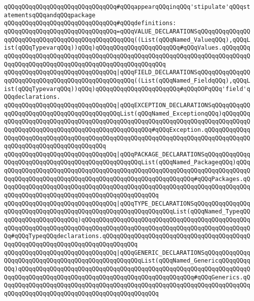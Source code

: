 \verb|qQQqqQQqqQQqqQQqqQQqqQQqqQQqqQQq#qQQqappearqQQqinqQQq'stipulate'qQQqstatementsqQQqandqQQqpackage|\newline
\verb|qQQqqQQqqQQqqQQqqQQqqQQqqQQqqQQq#qQQqdefinitions:|\newline
\newline
\newline
\verb|qQQqqQQqqQQqqQQqqQQqqQQqqQQqqQQq=qQQqVALUE_DECLARATIONSqQQqqQQqqQQqqQQqqQQqqQQqqQQqqQQqqQQqqQQqqQQqqQQqqQQq((List(qQQqNamed_ValueqQQq),qQQqList(qQQqTypevarqQQq))qQQq)qQQqqQQqqQQqqQQqqQQqqQQq#qQQqValues.qQQqqQQqqQQqqQQqqQQqqQQqqQQqqQQqqQQqqQQqqQQqqQQqqQQqqQQqqQQqqQQqqQQqqQQqqQQqqQQqqQQqqQQqqQQqqQQqqQQqqQQqqQQqqQQqqQQqqQQqqQQq|\newline
\verb|qQQqqQQqqQQqqQQqqQQqqQQqqQQqqQQq|\verb#|qQQqFIELD_DECLARATIONSqQQqqQQqqQQqqQQqqQQqqQQqqQQqqQQqqQQqqQQqqQQqqQQqqQQq((List(qQQqNamed_FieldqQQq),qQQqList(qQQqTypevarqQQq))qQQq)qQQqqQQqqQQqqQQqqQQqqQQq#\verb|#qQQqOOPqQQq'field'qQQqdeclarations.|\newline
\verb|qQQqqQQqqQQqqQQqqQQqqQQqqQQqqQQq|\verb#|qQQqEXCEPTION_DECLARATIONSqQQqqQQqqQQqqQQqqQQqqQQqqQQqqQQqqQQqqQQqqQQqList(qQQqNamed_ExceptionqQQq)qQQqqQQqqQQqqQQqqQQqqQQqqQQqqQQqqQQqqQQqqQQqqQQqqQQqqQQqqQQqqQQqqQQqqQQqqQQqqQQqqQQqqQQqqQQqqQQqqQQqqQQqqQQqqQQqqQQqqQQq#\verb|#qQQqException.qQQqqQQqqQQqqQQqqQQqqQQqqQQqqQQqqQQqqQQqqQQqqQQqqQQqqQQqqQQqqQQqqQQqqQQqqQQqqQQqqQQqqQQqqQQqqQQqqQQqqQQqqQQqqQQq|\newline
\verb|qQQqqQQqqQQqqQQqqQQqqQQqqQQqqQQq|\verb#|qQQqPACKAGE_DECLARATIONSqQQqqQQqqQQqqQQqqQQqqQQqqQQqqQQqqQQqqQQqqQQqqQQqqQQqList(qQQqNamed_PackageqQQq)qQQqqQQqqQQqqQQqqQQqqQQqqQQqqQQqqQQqqQQqqQQqqQQqqQQqqQQqqQQqqQQqqQQqqQQqqQQqqQQqqQQqqQQqqQQqqQQqqQQqqQQqqQQqqQQqqQQqqQQqqQQqqQQq#\verb|#qQQqPackages.qQQqqQQqqQQqqQQqqQQqqQQqqQQqqQQqqQQqqQQqqQQqqQQqqQQqqQQqqQQqqQQqqQQqqQQqqQQqqQQqqQQqqQQqqQQqqQQqqQQqqQQqqQQqqQQqqQQq|\newline
\verb|qQQqqQQqqQQqqQQqqQQqqQQqqQQqqQQq|\verb#|qQQqTYPE_DECLARATIONSqQQqqQQqqQQqqQQqqQQqqQQqqQQqqQQqqQQqqQQqqQQqqQQqqQQqqQQqqQQqqQQqList(qQQqNamed_TypeqQQqqQQqqQQqqQQqqQQqqQQq)qQQqqQQqqQQqqQQqqQQqqQQqqQQqqQQqqQQqqQQqqQQqqQQqqQQqqQQqqQQqqQQqqQQqqQQqqQQqqQQqqQQqqQQqqQQqqQQqqQQqqQQqqQQqqQQqqQQqqQQq#\verb|#qQQqTypeqQQqdeclarations.qQQqqQQqqQQqqQQqqQQqqQQqqQQqqQQqqQQqqQQqqQQqqQQqqQQqqQQqqQQqqQQqqQQqqQQqqQQqqQQq|\newline
\verb|qQQqqQQqqQQqqQQqqQQqqQQqqQQqqQQq|\verb#|qQQqGENERIC_DECLARATIONSqQQqqQQqqQQqqQQqqQQqqQQqqQQqqQQqqQQqqQQqqQQqqQQqqQQqList(qQQqNamed_GenericqQQqqQQqqQQq)qQQqqQQqqQQqqQQqqQQqqQQqqQQqqQQqqQQqqQQqqQQqqQQqqQQqqQQqqQQqqQQqqQQqqQQqqQQqqQQqqQQqqQQqqQQqqQQqqQQqqQQqqQQqqQQqqQQqqQQq#\verb|#qQQqGenerics.qQQqqQQqqQQqqQQqqQQqqQQqqQQqqQQqqQQqqQQqqQQqqQQqqQQqqQQqqQQqqQQqqQQqqQQqqQQqqQQqqQQqqQQqqQQqqQQqqQQqqQQqqQQqqQQqqQQq|\newline
